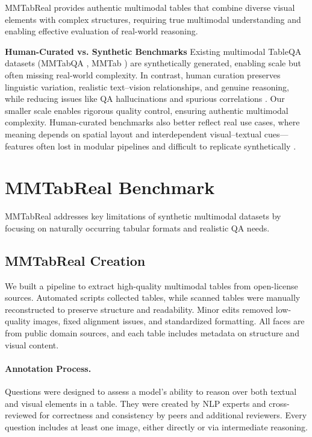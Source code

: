 \documentclass[11pt]{article}
\newcommand{\datasetName}{{\sc MMTabReal}\xspace}
\begin{document}
\datasetName provides authentic multimodal tables that combine diverse visual elements with complex structures, requiring true multimodal understanding and enabling effective evaluation of real-world reasoning.

\vspace{0.3em}

\noindent \textbf{Human-Curated vs. Synthetic Benchmarks} Existing multimodal TableQA datasets (MMTabQA \cite{mathur-etal-2024-knowledge}, MMTab \cite{zheng2024multimodal}) are synthetically generated, enabling scale but often missing real-world complexity. In contrast, human curation preserves linguistic variation, realistic text–vision relationships, and genuine reasoning, while reducing issues like QA hallucinations \cite{Ji_2023, bang2023multitaskmultilingualmultimodalevaluation} and spurious correlations \cite{zhao2024makesunlearninghard}. Our smaller scale enables rigorous quality control, ensuring authentic multimodal complexity. Human-curated benchmarks also better reflect real use cases, where meaning depends on spatial layout and interdependent visual–textual cues—features often lost in modular pipelines and difficult to replicate synthetically \cite{9712345,lee2023multimodality,cloutier2021using}.



\section{\datasetName Benchmark}
\label{sec:our_dataset}

\datasetName addresses key limitations of synthetic multimodal datasets by focusing on naturally occurring tabular formats and realistic QA needs. 

\subsection{\datasetName Creation}

We built a pipeline to extract high-quality multimodal tables from open-license sources. Automated scripts collected tables, while scanned tables were manually reconstructed to preserve structure and readability. Minor edits removed low-quality images, fixed alignment issues, and standardized formatting. All faces are from public domain sources, and each table includes metadata on structure and visual content.
\vspace{-0.4em}

\paragraph{Annotation Process.} Questions were designed to assess a model’s ability to reason over both textual and visual elements in a table. They were created by NLP experts and cross-reviewed for correctness and consistency by peers and additional reviewers. Every question includes at least one image, either directly or via intermediate reasoning.
\end{document}
